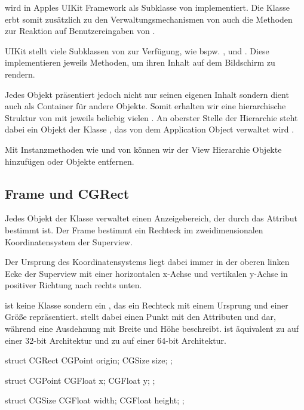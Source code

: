 \documentclass[parskip=half, final]{scrreprt}
\begin{document}
 wird in Apples UIKit Framework als Subklasse von  implementiert. Die Klasse erbt somit zusätzlich zu den Verwaltungsmechanismen von  auch die Methoden zur Reaktion auf Benutzereingaben von .

UIKit stellt viele Subklassen von  zur Verfügung, wie bspw. ,  und . Diese implementieren jeweils Methoden, um ihren Inhalt auf dem Bildschirm zu rendern.

Jedes  Objekt präsentiert jedoch nicht nur seinen eigenen Inhalt sondern dient auch als Container für andere  Objekte. Somit erhalten wir eine hierarchische Struktur von  mit jeweils beliebig vielen  . An oberster Stelle der Hierarchie steht dabei ein Objekt der Klasse , das von dem Application Object verwaltet wird .


Mit Instanzmethoden wie  und  von  können wir der View Hierarchie Objekte hinzufügen oder Objekte entfernen.

\subsection{Frame und CGRect}

Jedes Objekt der Klasse  verwaltet einen Anzeigebereich, der durch das Attribut  bestimmt ist. Der Frame bestimmt ein Rechteck im zweidimensionalen Koordinatensystem der Superview.

Der Ursprung des Koordinatensystems liegt dabei immer in der oberen linken Ecke der Superview  mit einer horizontalen x-Achse und vertikalen y-Achse in positiver Richtung nach rechts unten.


 ist keine Klasse sondern ein , das ein Rechteck mit einem Ursprung  und einer Größe  repräsentiert.  stellt dabei einen Punkt mit den Attributen  und  dar, während  eine Ausdehnung mit Breite  und Höhe  beschreibt.  ist äquivalent zu  auf einer 32-bit Architektur und zu  auf einer 64-bit Architektur.
\begin{objclst}
struct CGRect {
   CGPoint origin;
   CGSize size;
};

struct CGPoint {
   CGFloat x;
   CGFloat y;
};
 
struct CGSize {
   CGFloat width;
   CGFloat height;
};
\end{objclst}
\end{document}
